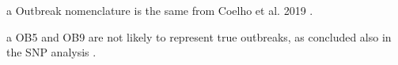 \begin{table}[h!]
{\begin{threeparttable}[b]
\begin{tabular}{@{}llllll@{}}
        \bottomrule
    \end{tabular}
    \begin{tablenotes}
       \item [a] {\footnotesize Outbreak nomenclature is the same from Coelho et al. 2019 \cite{coelho_genomic_2019}.}
       \item [a] {\footnotesize OB5 and OB9 are not likely to represent true outbreaks, as concluded also in the \ac{SNP} analysis \cite{coelho_genomic_2019}.}
    \end{tablenotes}
    \end{threeparttable}
    }
\end{table}


